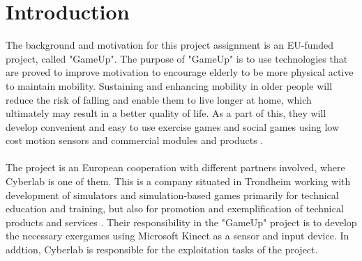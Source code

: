 \chapter{Introduction}
The background and motivation for this project assignment is an EU-funded project, called "GameUp". The purpose of "GameUp" is to use technologies that are proved to improve motivation to encourage elderly to be more physical active to maintain mobility. Sustaining and enhancing mobility in older people will reduce the risk of falling and enable them to live longer at home, which ultimately may result in a better quality of life. As a part of this, they will develop convenient and easy to use exercise games and social games using low cost motion sensors and commercial modules and products \cite{gameup}.\\ \\ The project is an European cooperation with different partners involved, where Cyberlab is one of them. This is a company situated in Trondheim working with development of simulators and simulation-based games primarily for technical education and training, but also for promotion and exemplification of technical products and services \cite{cyberlab}. Their responsibility in the "GameUp" project is to develop the necessary exergames using Microsoft Kinect as a sensor and input device. In addtion, Cyberlab is responsible for the exploitation tasks of the project.  \\ \\

